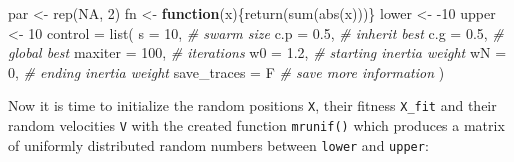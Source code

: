 \documentclass[
  oneside, a4paper, 12pt, openany]{book}
\newenvironment{Shaded}{\begin{snugshade}}{\end{snugshade}}
\newcommand{\AttributeTok}[1]{\textcolor[rgb]{0.77,0.63,0.00}{#1}}
\newcommand{\CommentTok}[1]{\textcolor[rgb]{0.56,0.35,0.01}{\textit{#1}}}
\newcommand{\ConstantTok}[1]{\textcolor[rgb]{0.00,0.00,0.00}{#1}}
\newcommand{\ControlFlowTok}[1]{\textcolor[rgb]{0.13,0.29,0.53}{\textbf{#1}}}
\newcommand{\DecValTok}[1]{\textcolor[rgb]{0.00,0.00,0.81}{#1}}
\newcommand{\FloatTok}[1]{\textcolor[rgb]{0.00,0.00,0.81}{#1}}
\newcommand{\FunctionTok}[1]{\textcolor[rgb]{0.00,0.00,0.00}{#1}}
\newcommand{\NormalTok}[1]{#1}
\newcommand{\OtherTok}[1]{\textcolor[rgb]{0.56,0.35,0.01}{#1}}
\newcommand{\SpecialCharTok}[1]{\textcolor[rgb]{0.00,0.00,0.00}{#1}}
\theoremstyle{definition}
\theoremstyle{definition}
\theoremstyle{definition}
\theoremstyle{definition}
\theoremstyle{remark}
\begin{document}
\begin{Shaded}
\begin{Highlighting}[]
\NormalTok{par }\OtherTok{\textless{}{-}} \FunctionTok{rep}\NormalTok{(}\ConstantTok{NA}\NormalTok{, }\DecValTok{2}\NormalTok{)}
\NormalTok{fn }\OtherTok{\textless{}{-}} \ControlFlowTok{function}\NormalTok{(x)\{}\FunctionTok{return}\NormalTok{(}\FunctionTok{sum}\NormalTok{(}\FunctionTok{abs}\NormalTok{(x)))\}}
\NormalTok{lower }\OtherTok{\textless{}{-}} \SpecialCharTok{{-}}\DecValTok{10}
\NormalTok{upper }\OtherTok{\textless{}{-}} \DecValTok{10}
\NormalTok{control }\OtherTok{=} \FunctionTok{list}\NormalTok{(}
  \AttributeTok{s =} \DecValTok{10}\NormalTok{, }\CommentTok{\# swarm size}
  \AttributeTok{c.p =} \FloatTok{0.5}\NormalTok{, }\CommentTok{\# inherit best}
  \AttributeTok{c.g =} \FloatTok{0.5}\NormalTok{, }\CommentTok{\# global best}
  \AttributeTok{maxiter =} \DecValTok{100}\NormalTok{, }\CommentTok{\# iterations}
  \AttributeTok{w0 =} \FloatTok{1.2}\NormalTok{, }\CommentTok{\# starting inertia weight}
  \AttributeTok{wN =} \DecValTok{0}\NormalTok{, }\CommentTok{\# ending inertia weight}
  \AttributeTok{save\_traces =}\NormalTok{ F }\CommentTok{\# save more information}
\NormalTok{)}
\end{Highlighting}
\end{Shaded}

\normalsize\vspace{0.1cm}

Now it is time to initialize the random positions \texttt{X}, their fitness \texttt{X\_fit} and their random velocities \texttt{V} with the created function \texttt{mrunif()} which produces a matrix of uniformly distributed random numbers between \texttt{lower} and \texttt{upper}:

\vspace{0.1cm}\fontsize{11}{12}\selectfont

\begin{Shaded}
\end{Shaded}
\end{document}
